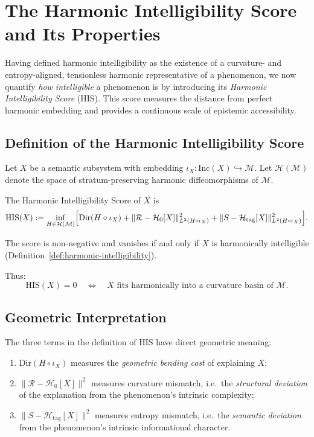 \section{The Harmonic Intelligibility Score and Its Properties}

Having defined harmonic intelligibility as the existence of a curvature- and
entropy-aligned, tensionless harmonic representative of a phenomenon, we now
quantify \emph{how intelligible} a phenomenon is by introducing its
\emph{Harmonic Intelligibility Score} (HIS).  
This score measures the distance from perfect harmonic embedding and provides
a continuous scale of epistemic accessibility.

\subsection*{Definition of the Harmonic Intelligibility Score}

Let $X$ be a semantic subsystem with embedding $\iota_X :
\mathrm{Inc}(X)\hookrightarrow\mathcal{M}$.  
Let $\mathcal{H}(\mathcal{M})$ denote the space of stratum-preserving harmonic
diffeomorphisms of $\mathcal{M}$.

\begin{definition}
\label{def:HIS}
The Harmonic Intelligibility Score of $X$ is
\begin{equation}
\mathrm{HIS}(X)
  := \inf_{H\in\mathcal{H}(\mathcal{M})}
         \Bigl[
            \mathrm{Dir}(H\circ\iota_X)
            +
            \|\mathcal{R} - \mathcal{H}_0[X]\|_{L^2(H\circ\iota_X)}^2
            +
            \|S - \mathcal{H}_{\mathrm{tag}}[X]\|_{L^2(H\circ\iota_X)}^2
         \Bigr].
\end{equation}
\end{definition}

The score is non-negative and vanishes if and only if $X$ is harmonically
intelligible (Definition~\ref{def:harmonic-intelligibility}).

Thus:
\[
\mathrm{HIS}(X)=0
\quad\Longleftrightarrow\quad
\text{$X$ fits harmonically into a curvature basin of $\mathcal{M}$.}
\]

\subsection*{Geometric Interpretation}

The three terms in the definition of HIS have direct geometric meaning:

\begin{enumerate}
\item $\mathrm{Dir}(H\circ\iota_X)$  
      measures the \emph{geometric bending cost} of explaining $X$;
\item $\|\mathcal{R} - \mathcal{H}_0[X]\|^2$  
      measures curvature mismatch, i.e.\ the \emph{structural deviation} of
      the explanation from the phenomenon’s intrinsic complexity;
\item $\|S - \mathcal{H}_{\mathrm{tag}}[X]\|^2$  
      measures entropy mismatch, i.e.\ the \emph{semantic deviation} from the
      phenomenon’s intrinsic informational character.
\end{enumerate}


